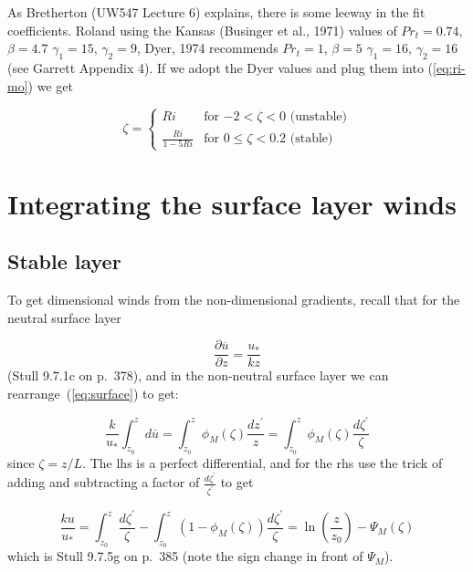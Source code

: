 \documentclass[11pt]{article}
\begin{document}
As Bretherton (UW547 Lecture 6) explains, there is some leeway in the fit coefficients.
Roland using the Kansas (Businger et al., 1971) values of $Pr_t=0.74$, $\beta=4.7$ $\gamma_1 = 15$, $\gamma_2=9$,
Dyer, 1974 recommends $Pr_t=1$, $\beta=5$ $\gamma_1 = 16$, $\gamma_2=16$ (see Garrett Appendix 4).
If we adopt the Dyer values and plug them into (\ref{eq:ri-mo}) we get

\begin{equation}
  \label{eq:busdy3}
\zeta = 
\begin{cases}
  Ri  &  \text{for $-2 < \zeta < 0$ (unstable)}\\
  \frac{Ri }{1 - 5 Ri}  & \text{for $0 \le \zeta < 0.2$ (stable)}
\end{cases}
\end{equation}
 
\section{Integrating the surface layer winds}
\label{sec:integr-surf-layer}

\subsection{Stable layer}
\label{sec:stable-layer}



To get dimensional winds from the non-dimensional gradients, recall that for the neutral
surface layer

\begin{equation}
  \label{eq:neutral}
  \frac{ \partial \overline{ u}}{\partial z}  = \frac{ u_*}{kz} 
\end{equation}
(Stull 9.7.1c on p.~378), and in the non-neutral surface layer we can rearrange~(\ref{eq:surface})
to get:

\begin{equation}
  \label{eq:non-neutral}
\frac{ k}{u_*} \int_{z_0 }^{z}\! d \overline{ u}
= \int_{z_0 }^{z}\!\phi_M(\zeta) \frac{ d z^\prime}{z} = \int_{z_0 }^{z}\!\phi_M(\zeta) \frac{ d \zeta^\prime}{\zeta}
\end{equation}
since $\zeta = z/L$.  The lhs is a perfect differential, and for the rhs use the
trick of adding and subtracting a factor of $\frac{d\zeta^\prime }{\zeta^\prime}$ to get

\begin{equation}
  \label{eq:integbus}
  \frac{ k u}{u_*} = \int_{z_0 }^{z}\! \frac{ d \zeta^\prime}{\zeta}- \int_{z_0 }^{z}\!(1 - \phi_M(\zeta)) \frac{ d \zeta^\prime}{\zeta}
  = \ln \left ( \frac{z }{z_0} \right ) - \Psi_M(\zeta)
\end{equation}
which is Stull 9.7.5g on p.~385 (note the sign change in front of $\Psi_M$).
\end{document}
